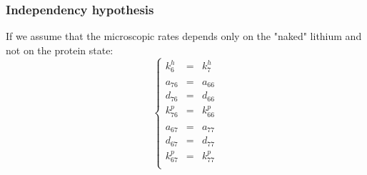 \documentclass[aps,onecolumn,11pt]{revtex4}
\begin{document}
\subsubsection{Independency hypothesis}
If we assume that the microscopic rates depends only on the "naked" lithium and not on the protein state:
\begin{equation}
\left\lbrace
\begin{array}{rcl}
k^h_6    & = & k^h_7\\
\\
a_{76}   & = & a_{66}\\
d_{76}   & = & d_{66}\\
k^p_{76} & = & k^p_{66}\\
\\
a_{67}   & = & a_{77}\\
d_{67}   & = & d_{77}\\
k^p_{67} & = & k^p_{77}\\
\end{array}
\right.
\end{equation}
\end{document}
